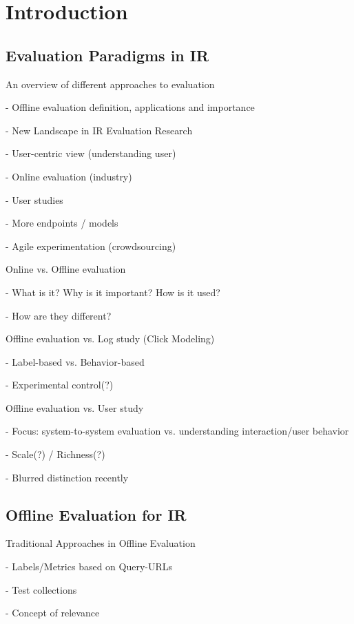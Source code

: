 \documentclass[openany]{now} %
\newcommand{\newpar}{\bigskip\noindent}
\begin{document}
\chapter{Introduction}
\label{c-intro}

\section{Evaluation Paradigms in IR}

An overview of different approaches to evaluation

- Offline evaluation definition, applications and importance

- New Landscape in IR Evaluation Research

- User-centric view (understanding user)

- Online evaluation (industry)

- User studies

- More endpoints / models

- Agile experimentation (crowdsourcing)

\newpar
Online \cite{INR-XYZ} vs. Offline evaluation \cite{INR-009} 

- What is it? Why is it important? How is it used?

- How are they different?


\newpar
Offline evaluation vs. Log study (Click Modeling) \cite{chuklin2015click}

- Label-based vs. Behavior-based

- Experimental control(?)

\newpar
Offline evaluation vs. User study \cite{kelly2009methods}

- Focus: system-to-system evaluation vs. understanding interaction/user behavior

- Scale(?) / Richness(?)

- Blurred distinction recently
\cite{Bron:2013}
\cite{Liu:2014}
\cite{Shah:2011}


\section{Offline Evaluation for IR}

Traditional Approaches in Offline Evaluation

- Labels/Metrics based on Query-URLs

- Test collections 

- Concept of relevance 

\cite{borlund2003} \cite{cleverdon67} \cite{voor:trec05}
\end{document}
